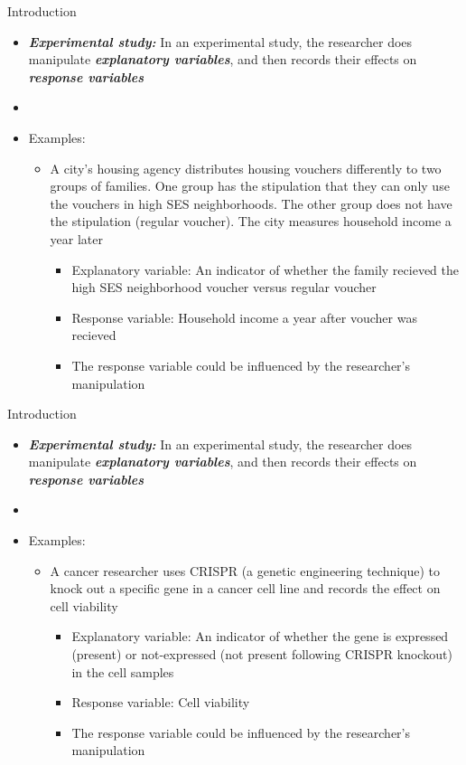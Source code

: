 \documentclass[xcolor=dvipsnames]{beamer}
\begin{document}
\begin{frame}{Introduction}
	\begin{itemize}
		\item \textbf{\emph{Experimental study:}} In an experimental study, the researcher does manipulate \textbf{\emph{explanatory variables}}, and then records their effects on \textbf{\emph{response variables}}
		\item[]
		\item Examples:
		\begin{itemize}
			\item A city's housing agency distributes housing vouchers differently to two groups of families. One group has the stipulation that they can only use the vouchers in high SES neighborhoods. The other group does not have the stipulation (regular voucher). The city measures household income a year later
			\begin{itemize}
				\item Explanatory variable: An indicator of whether the family recieved the high SES neighborhood voucher versus regular voucher
				\item Response variable: Household income a year after voucher was recieved
				\item The response variable could be influenced by the researcher's manipulation 
			\end{itemize}
	\end{itemize}
\end{itemize}
\end{frame}

\begin{frame}{Introduction}
\begin{itemize}
	\item \textbf{\emph{Experimental study:}} In an experimental study, the researcher does manipulate \textbf{\emph{explanatory variables}}, and then records their effects on \textbf{\emph{response variables}}
	\item[]
	\item Examples:
	\begin{itemize}
		\item A cancer researcher uses CRISPR (a genetic engineering technique) to knock out a specific gene in a cancer cell line and records the effect on cell viability
		\begin{itemize}
			\item Explanatory variable: An indicator of whether the gene is expressed (present) or not-expressed (not present following CRISPR knockout) in the cell samples
			\item Response variable: Cell viability
			\item The response variable could be influenced by the researcher's manipulation 
		\end{itemize}
	\end{itemize}
\end{itemize}
\end{frame}
\end{document}

